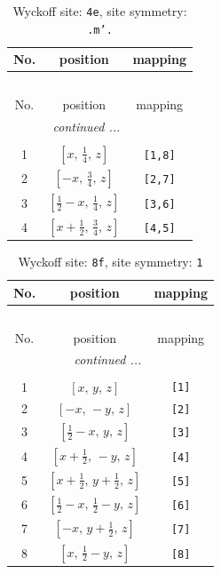 \documentclass[fleqn,8pt]{jsarticle}
\begin{document}
\renewcommand{\arraystretch}{1.2}
\begin{longtable}{ccc}
\caption{Wyckoff site: {\tt 4e}, site symmetry: {\tt .m'.}}
 \\
 \hline \hline
No. & position & mapping \\ \hline \endfirsthead

\multicolumn{2}{l}{\tablename\ \thetable{}} \\
 \hline \hline
No. & position & mapping \\ \hline \endhead

 \hline \hline
\multicolumn{2}{r}{\footnotesize\it continued ...} \\ \endfoot

 \hline \hline
\multicolumn{2}{r}{} \\ \endlastfoot

1 & $\left[ x,\, \frac{1}{4},\, z \right]$ & {\tt [1,8]} \\ \hline
2 & $\left[ - x,\, \frac{3}{4},\, z \right]$ & {\tt [2,7]} \\ \hline
3 & $\left[ \frac{1}{2} - x,\, \frac{1}{4},\, z \right]$ & {\tt [3,6]} \\ \hline
4 & $\left[ x + \frac{1}{2},\, \frac{3}{4},\, z \right]$ & {\tt [4,5]} \\
\end{longtable}
\renewcommand{\arraystretch}{1.2}
\begin{longtable}{ccc}
\caption{Wyckoff site: {\tt 8f}, site symmetry: {\tt 1}}
 \\
 \hline \hline
No. & position & mapping \\ \hline \endfirsthead

\multicolumn{2}{l}{\tablename\ \thetable{}} \\
 \hline \hline
No. & position & mapping \\ \hline \endhead

 \hline \hline
\multicolumn{2}{r}{\footnotesize\it continued ...} \\ \endfoot

 \hline \hline
\multicolumn{2}{r}{} \\ \endlastfoot

1 & $\left[ x,\, y,\, z \right]$ & {\tt [1]} \\ \hline
2 & $\left[ - x,\, - y,\, z \right]$ & {\tt [2]} \\ \hline
3 & $\left[ \frac{1}{2} - x,\, y,\, z \right]$ & {\tt [3]} \\ \hline
4 & $\left[ x + \frac{1}{2},\, - y,\, z \right]$ & {\tt [4]} \\ \hline
5 & $\left[ x + \frac{1}{2},\, y + \frac{1}{2},\, z \right]$ & {\tt [5]} \\ \hline
6 & $\left[ \frac{1}{2} - x,\, \frac{1}{2} - y,\, z \right]$ & {\tt [6]} \\ \hline
7 & $\left[ - x,\, y + \frac{1}{2},\, z \right]$ & {\tt [7]} \\ \hline
8 & $\left[ x,\, \frac{1}{2} - y,\, z \right]$ & {\tt [8]} \\
\end{longtable}
\end{document}
